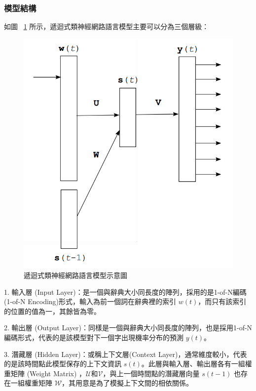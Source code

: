 \subsubsection{模型結構}
如圖 ~\ref{fig:chap5_rnn_structure} 所示，遞迴式類神經網路語言模型主要可以分為三個層級：
\begin{figure}
\centering
\includegraphics[scale=0.3]{images/chap5_rnn_structure.png}
\caption{遞迴式類神經網路語言模型示意圖} \label{fig:chap5_rnn_structure}
\end{figure}

1. 輸入層 (Input Layer)：是一個與辭典大小同長度的陣列，採用的是1-of-N編碼 (1-of-N Encoding)形式，輸入為前一個詞在辭典裡的索引 $w(t)$，而只有該索引的位置的值為一，其餘皆為零。

2. 輸出層 (Output Layer)：同樣是一個與辭典大小同長度的陣列，也是採用1-of-N編碼形式，代表的是該模型對下一個字出現機率分布的預測 $y(t)$。

3. 潛藏層 (Hidden Layer)：或稱上下文層(Context Layer)，通常維度較小，代表的是該時間點此模型保存的上下文資訊 $s(t)$。此層與輸入層、輸出層各有一組權重矩陣 (Weight Matrix) ，$\mathcal{U}$和$\mathcal{V}$，與上一個時間點的潛藏層向量 $s(t-1)$ 也存在一組權重矩陣 $\mathcal{W}$，其用意是為了模擬上下文間的相依關係。

